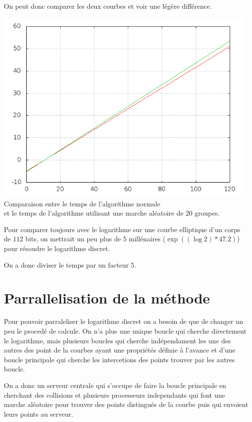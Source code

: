 \documentclass[a4paper,10pt]{report}
\begin{document}
\newpage
On peut donc comparer les deux courbes et voir une légère différence.
\begin{center}
  \includegraphics[width = 13cm]{compa_normal_multi.png}
   Comparaison entre le temps de l'algorithme normale\\
   et le temps de l'algorithme utilisant une marche aléatoire de 20 groupes.
\end{center}


Pour comparer toujours avec le logarithme sur une courbe elliptique d'un corps de $112$ bits,  on mettrait un peu plus de 5 millénaires ($\exp{((\log{2})*47.2)}$) pour résoudre le logarithme discret.

On a donc diviser le temps par un facteur 5.

\chapter{Parrallelisation de la méthode}

Pour pouvoir parraleliser le logarithme discret on a besoin de que de changer un peu le procedé de calcule. On n'a plus une unique boucle qui cherche directement le logarithme, mais plusieurs boucles qui cherche indépendament 
les une des autres des point de la courbes ayant une propriétés définie à l'avance et d'une boucle principale qui cherche les intercetions des points trouver par les autres boucle.

On a donc un serveur centrale qui s'occupe de faire la boucle principale en cherchant des collisions et plusieurs processeurs independants qui font une marche aléatoire pour trouver des points distingués de la courbe puis qui envoient
leurs points au serveur.
\end{document}
